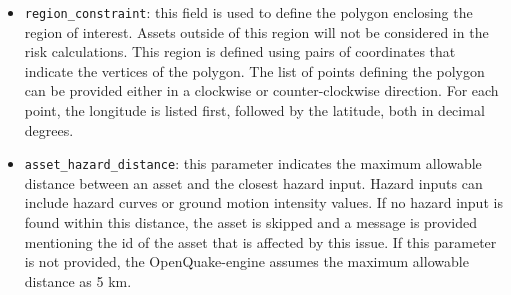 \begin{itemize}

	\item \Verb+region_constraint+: this field is used to define the polygon
	enclosing the region of interest. Assets outside of this region will not
	be considered in the risk calculations. This region is defined using pairs
	of coordinates that indicate the vertices of the polygon. The list of
	points defining the polygon can be provided either in a clockwise or
	counter-clockwise direction. For each point, the longitude is listed first,
	followed by the latitude, both in decimal degrees.

	\item \Verb+asset_hazard_distance+: this parameter indicates the maximum
	allowable distance between an \gls{asset} and the closest hazard input.
	Hazard inputs can include hazard curves or ground motion intensity values.
	If no hazard input is found within this distance, the \gls{asset} is
	skipped and a message is provided mentioning the id of the asset that is
	affected by this issue. If this parameter is not provided, the
	OpenQuake-engine assumes the maximum allowable distance as 5 km.

\end{itemize}
